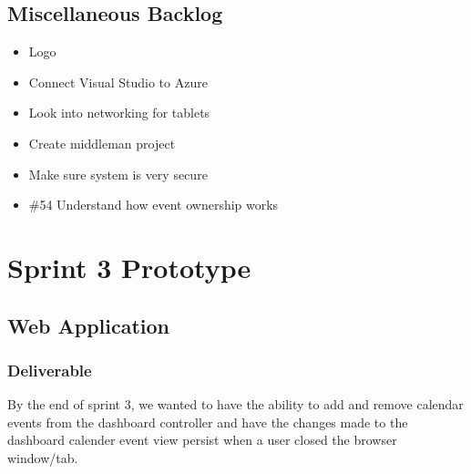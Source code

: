 \subsection*{Miscellaneous Backlog}
\begin{itemize}
\item Logo
\item Connect Visual Studio to Azure
\item Look into networking for tablets
\item Create middleman project
\item Make sure system is very secure
\item \#54 Understand how event ownership works
\end{itemize}

\section{Sprint 3 Prototype}
\subsection{Web Application}
\subsubsection{Deliverable}
By the end of sprint 3, we wanted to have the ability to add and remove calendar events from the dashboard controller and have the changes made to the dashboard calender event view persist when a user closed the browser window/tab.
